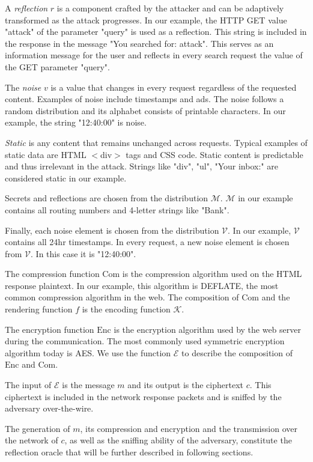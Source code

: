 A \textit{reflection} $r$ is a component crafted by the attacker and can be
adaptively transformed as the attack progresses. In our example, the HTTP GET
value "attack" of the parameter "query" is used as a reflection. This string is
included in the response in the message "You searched for: attack". This serves
as an information message for the user and reflects in every search request the
value of the GET parameter "query".

The \textit{noise} $v$ is a value that changes in every request regardless of
the requested content. Examples of noise include timestamps and ads. The noise
follows a random distribution and its alphabet consists of printable characters.
In our example, the string "12:40:00" is noise.

\textit{Static} is any content that remains unchanged across requests. Typical
examples of static data are HTML $<$div$>$ tags and CSS code. Static content is
predictable and thus irrelevant in the attack. Strings like "div", "ul", "Your
inbox:" are considered static in our example.

Secrets and reflections are chosen from the distribution $\mathcal{M}$.
$\mathcal{M}$ in our example contains all routing numbers and 4-letter strings
like "Bank".

Finally, each noise element is chosen from the distribution $\mathcal{V}$. In
our example, $\mathcal{V}$ contains all 24hr timestamps. In every request, a new
noise element is chosen from $\mathcal{V}$. In this case it is "12:40:00".

The compression function $\textrm{Com}$ is the compression algorithm used on the
HTML response plaintext. In our example, this algorithm is DEFLATE, the most
common compression algorithm in the web. The composition of $\textrm{Com}$ and
the rendering function $f$ is the encoding function $\mathcal{K}$.

The encryption function $\textrm{Enc}$ is the encryption algorithm used by the
web server during the communication. The most commonly used symmetric encryption
algorithm today is AES. We use the function $\mathcal{E}$ to describe the
composition of $\textrm{Enc}$ and $\textrm{Com}$.

The input of $\mathcal{E}$ is the message $m$ and its output is the ciphertext
$c$.  This ciphertext is included in the network response packets and is sniffed
by the adversary over-the-wire.

The generation of $m$, its compression and encryption and the transmission over
the network of $c$, as well as the sniffing ability of the adversary, constitute
the reflection oracle that will be further described in following sections.

